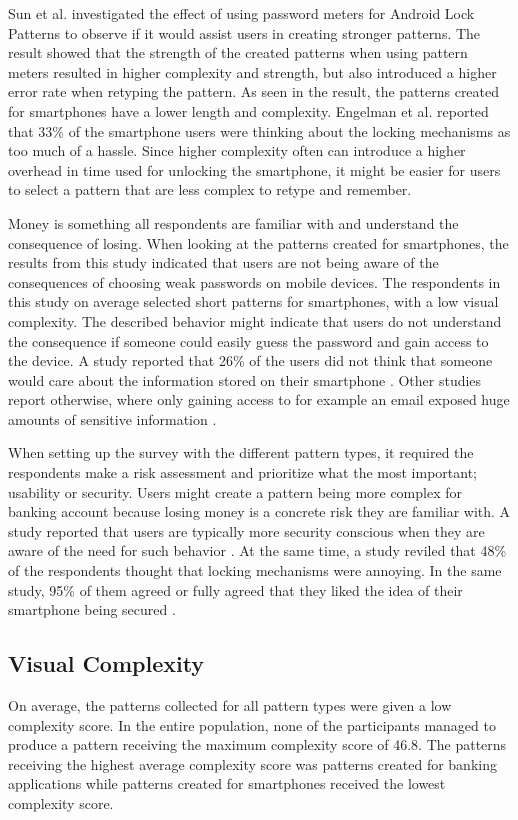       Sun et al. \cite{Sun} investigated the effect of using password meters for Android Lock Patterns to observe if it would assist users in creating stronger patterns. The result showed that the strength of the created patterns when using pattern meters resulted in higher complexity and strength, but also introduced a higher error rate when retyping the pattern. As seen in the result, the patterns created for smartphones have a lower length and complexity. Engelman et al. \cite{Egelman} reported that 33\% of the smartphone users were thinking about the locking mechanisms as too much of a hassle. Since higher complexity often can introduce a higher overhead in time used for unlocking the smartphone, it might be easier for users to select a pattern that are less complex to retype and remember.   

      Money is something all respondents are familiar with and understand the consequence of losing. When looking at the patterns created for smartphones, the results from this study indicated that users are not being aware of the consequences of choosing weak passwords on mobile devices. The respondents in this study on average selected short patterns for smartphones, with a low visual complexity. The described behavior might indicate that users do not understand the consequence if someone could easily guess the password and gain access to the device. A study reported that 26\% of the users did not think that someone would care about the information stored on their smartphone \cite{Egelman}. Other studies report otherwise, where only gaining access to for example an email exposed huge amounts of sensitive information \cite{Egelman}. 

      When setting up the survey with the different pattern types, it required the respondents make a risk assessment and prioritize what the most important; usability or security. Users might create a pattern being more complex for banking account because losing money is a concrete risk they are familiar with. A study reported that users are typically more security conscious when they are aware of the need for such behavior \cite{Sasse}. At the same time, a study reviled that 48\% of the respondents thought that locking mechanisms were annoying. In the same study, 95\% of them agreed or fully agreed that they liked the idea of their smartphone being secured \cite{habits3}.

    \subsection{Visual Complexity}
      On average, the patterns collected for all pattern types were given a low complexity score. In the entire population, none of the participants managed to produce a pattern receiving the maximum complexity score of 46.8. The patterns receiving the highest average complexity score was patterns created for banking applications while patterns created for smartphones received the lowest complexity score. 


